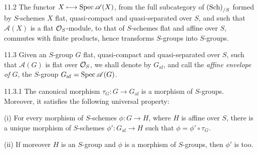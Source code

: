 \begin{corollary}{11.2}\label{VIB.11.2}
The functor $X\longmapsto\operatorname{Spec}\mathscr A(X)$, from the full subcategory of $\textup{(Sch)}_{/S}$ formed by $S$-schemes $X$ flat, quasi-compact and quasi-separated over $S$, and such that $\mathscr A(X)$ is a flat $\mathcal{O}_S$-module, to that of $S$-schemes flat and affine over $S$, commutes with finite products, hence transforms $S$-groups into $S$-groups.
\end{corollary}

\begin{definition}{11.3}\label{VIB.11.3}
Given an $S$-group $G$ flat, quasi-compact and quasi-separated over $S$, such that $\mathscr A(G)$ is flat over $\mathcal{O}_S$, we shall denote by $G_{\mathrm{af}}$, and call the \emph{affine envelope of $G$}, the $S$-group $G_{\mathrm{af}}=\operatorname{Spec}\mathscr A(G)$.
\end{definition}

\begin{proposition}{11.3.1}\label{VIB.11.3.1}
The canonical morphism $\tau_G:G\to G_{\mathrm{af}}$ is a morphism of $S$-groups. Moreover, it satisfies the following universal property:

(i) For every morphism of $S$-schemes $\phi:G\to H$, where $H$ is affine over $S$, there is a unique morphism of $S$-schemes $\phi':G_{\mathrm{af}}\to H$ such that $\phi=\phi'\circ\tau_G$.

(ii) If moreover $H$ is an $S$-group and $\phi$ is a morphism of $S$-groups, then $\phi'$ is too.
\end{proposition}

